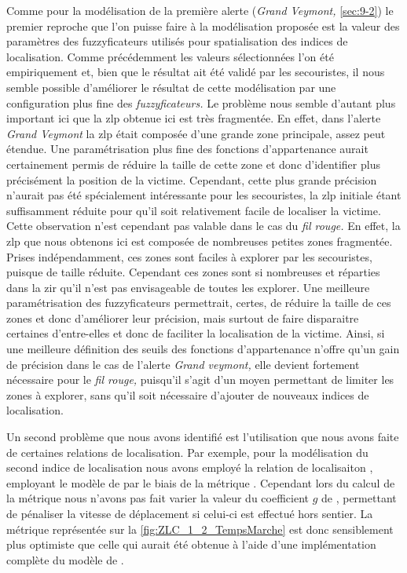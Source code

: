 Comme pour la modélisation de la première alerte (\emph{Grand
  Veymont,} \autoref{sec:9-2}) le premier reproche que l'on puisse
faire à la modélisation proposée est la valeur des paramètres des
fuzzyficateurs utilisés pour spatialisation des indices de
localisation. Comme précédemment les valeurs sélectionnées l'on été
empiriquement et, bien que le résultat ait été validé par les
secouristes, il nous semble possible d'améliorer le résultat de cette
modélisation par une configuration plus fine des
\emph{fuzzyficateurs.} Le problème nous semble d'autant plus important
ici que la \ac{zlp} obtenue ici est très fragmentée. En effet, dans
l'alerte \emph{Grand Veymont} la \ac{zlp} était composée d'une grande
zone principale, assez peut étendue. Une paramétrisation plus fine des
fonctions d'appartenance aurait certainement permis de réduire la
taille de cette zone et donc d'identifier plus précisément la position
de la victime. Cependant, cette plus grande précision n'aurait pas été
spécialement intéressante pour les secouristes, la \ac{zlp} initiale
étant suffisamment réduite pour qu'il soit relativement facile de
localiser la victime. Cette observation n'est cependant pas valable
dans le cas du \emph{fil rouge.} En effet, la \ac{zlp} que nous
obtenons ici est composée de nombreuses petites zones
fragmentée. Prises indépendamment, ces zones sont faciles à explorer
par les secouristes, puisque de taille réduite. Cependant ces zones
sont si nombreuses et réparties dans la \ac{zir} qu'il n'est pas
envisageable de toutes les explorer. Une meilleure paramétrisation des
fuzzyficateurs permettrait, certes, de réduire la taille de ces zones
et donc d'améliorer leur précision, mais surtout de faire disparaitre
certaines d'entre-elles et donc de faciliter la localisation de la
victime. Ainsi, si une meilleure définition des seuils des fonctions
d'appartenance n'offre qu'un gain de précision dans le cas de l'alerte
\emph{Grand veymont,} elle devient fortement nécessaire pour le
\emph{fil rouge,} puisqu'il s'agit d'un moyen permettant de limiter
les zones à explorer, sans qu'il soit nécessaire d'ajouter de nouveaux
indices de localisation.

Un second problème que nous avons identifié est l'utilisation que nous
avons faite de certaines relations de localisation. Par exemple, pour
la modélisation du second indice de localisation nous avons employé la
relation de localisaiton ,
employant le modèle de \textcite{Tobler1993} par le biais de la
métrique . Cependant lors du calcul de la
métrique nous n'avons pas fait varier la valeur du coefficient \(g\)
de \textcite{Tobler1993}, permettant de pénaliser la vitesse de
déplacement si celui-ci est effectué hors sentier. La métrique
représentée sur la \autoref{fig:ZLC_1_2_TempsMarche} est donc
sensiblement plus optimiste que celle qui aurait été obtenue à l'aide
d'une implémentation complète du modèle de \textcite{Tobler1993}.

